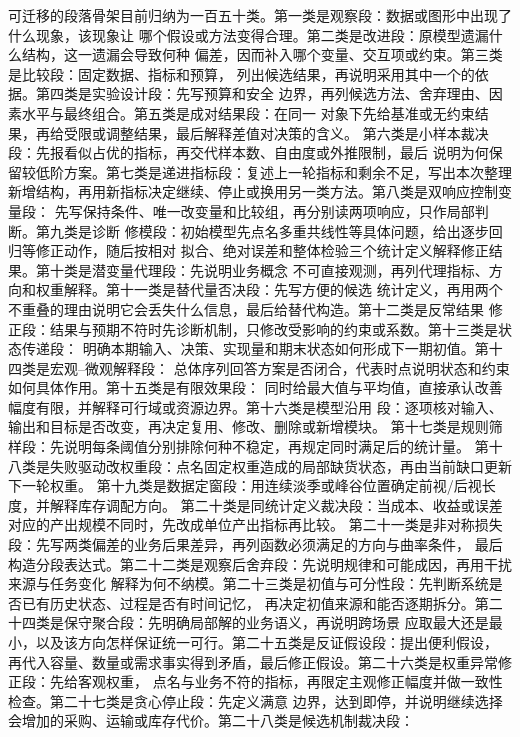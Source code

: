 可迁移的段落骨架目前归纳为一百五十类。第一类是观察段：数据或图形中出现了什么现象，该现象让
哪个假设或方法变得合理。第二类是改进段：原模型遗漏什么结构，这一遗漏会导致何种
偏差，因而补入哪个变量、交互项或约束。第三类是比较段：固定数据、指标和预算，
列出候选结果，再说明采用其中一个的依据。第四类是实验设计段：先写预算和安全
边界，再列候选方法、舍弃理由、因素水平与最终组合。第五类是成对结果段：在同一
对象下先给基准或无约束结果，再给受限或调整结果，最后解释差值对决策的含义。
第六类是小样本裁决段：先报看似占优的指标，再交代样本数、自由度或外推限制，最后
说明为何保留较低阶方案。第七类是递进指标段：复述上一轮指标和剩余不足，写出本次整理
新增结构，再用新指标决定继续、停止或换用另一类方法。第八类是双响应控制变量段：
先写保持条件、唯一改变量和比较组，再分别读两项响应，只作局部判断。第九类是诊断
修模段：初始模型先点名多重共线性等具体问题，给出逐步回归等修正动作，随后按相对
拟合、绝对误差和整体检验三个统计定义解释修正结果。第十类是潜变量代理段：先说明业务概念
不可直接观测，再列代理指标、方向和权重解释。第十一类是替代量否决段：先写方便的候选
统计定义，再用两个不重叠的理由说明它会丢失什么信息，最后给替代构造。第十二类是反常结果
修正段：结果与预期不符时先诊断机制，只修改受影响的约束或系数。第十三类是状态传递段：
明确本期输入、决策、实现量和期末状态如何形成下一期初值。第十四类是宏观--微观解释段：
总体序列回答方案是否闭合，代表时点说明状态和约束如何具体作用。第十五类是有限效果段：
同时给最大值与平均值，直接承认改善幅度有限，并解释可行域或资源边界。第十六类是模型沿用
段：逐项核对输入、输出和目标是否改变，再决定复用、修改、删除或新增模块。
第十七类是规则筛样段：先说明每条阈值分别排除何种不稳定，再规定同时满足后的统计量。
第十八类是失败驱动改权重段：点名固定权重造成的局部缺货状态，再由当前缺口更新下一轮权重。
第十九类是数据定窗段：用连续淡季或峰谷位置确定前视/后视长度，并解释库存调配方向。
第二十类是同统计定义裁决段：当成本、收益或误差对应的产出规模不同时，先改成单位产出指标再比较。
第二十一类是非对称损失段：先写两类偏差的业务后果差异，再列函数必须满足的方向与曲率条件，
最后构造分段表达式。第二十二类是观察后舍弃段：先说明规律和可能成因，再用干扰来源与任务变化
解释为何不纳模。第二十三类是初值与可分性段：先判断系统是否已有历史状态、过程是否有时间记忆，
再决定初值来源和能否逐期拆分。第二十四类是保守聚合段：先明确局部解的业务语义，再说明跨场景
应取最大还是最小，以及该方向怎样保证统一可行。第二十五类是反证假设段：提出便利假设，
再代入容量、数量或需求事实得到矛盾，最后修正假设。第二十六类是权重异常修正段：先给客观权重，
点名与业务不符的指标，再限定主观修正幅度并做一致性检查。第二十七类是贪心停止段：先定义满意
边界，达到即停，并说明继续选择会增加的采购、运输或库存代价。第二十八类是候选机制裁决段：
